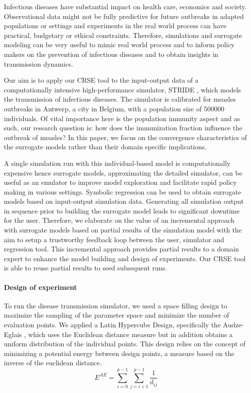 
Infectious diseases have substantial impact on health care, economics and society. 
Observational data might not be fully predictive for future outbreaks in adapted populations or settings and experiments in the real world process can have practical, budgetary or ethical constraints. Therefore, simulations and surrogate modeling can be very useful to mimic real world process and to inform policy makers on the prevention of infectious diseases and to obtain insights in transmission dynamics.

Our aim is to apply our CRSE tool to the input-output data of a computationally intensive high-performance simulator, STRIDE \citep{stride}, which models the transmission of infectious diseases.
The simulator is calibrated for measles outbreaks in Antwerp, a city in Belgium, with a population size of 500000 individuals. Of vital importance here is the population immunity aspect and as such, our research question is: how does the immunization fraction influence the outbreak of measles?
In this paper, we focus on the convergence characteristics of the surrogate models rather than their domain specific implications. 

A single simulation run with this individual-based model is computationally expensive hence surrogate models, approximating the detailed simulator, can be useful as an emulator to improve model exploration and facilitate rapid policy making in various settings. 
Symbolic regression can be used to obtain surrogate models based on input-output simulation data. Generating all simulation output in sequence prior to building the surrogate model leads to significant downtime for the user. 
Therefore, we elaborate on the value of an incremental approach with surrogate models based on partial results of the simulation model with the aim to setup a trustworthy feedback loop between the user, simulator and regression tool. 
This incremental approach provides partial results to a domain expert to enhance the model building and design of experiments. Our CRSE tool is able to reuse partial results to seed subsequent runs. %

\paragraph{Design of experiment}
To run the disease transmission simulator, we used a space filling design to maximize the sampling of the parameter space and minimize the number of evaluation points. We applied a Latin Hypercube Design, specifically the Audze-Eglais \citep{AudzeEglais, AudzeEglais2, AudzeEglais3}, which uses the Euclidean distance measure but in addition obtains a uniform distribution of the individual points. This design relies on the concept of minimizing a potential energy between design points, a measure based on the inverse of the euclidean distance.
\[
E^{AE} = \sum_{i=0}^{p-1} {\sum_{j=i+1}^{p-1} {\frac{1}{d_{ij}}}}
\]


